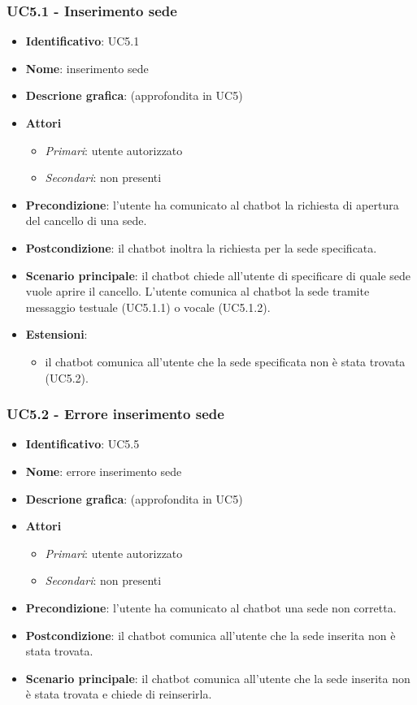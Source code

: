 \subsubsection{UC5.1 - Inserimento sede}
\begin{itemize}
    \item \textbf{Identificativo}: UC5.1
    \item \textbf{Nome}: inserimento sede
    \item \textbf{Descrione grafica}: (approfondita in UC5)
    \item \textbf{Attori}
 \begin{itemize} 
    \item \textit{Primari}: utente autorizzato 
    \item \textit{Secondari}: non presenti
 \end{itemize}
 \item \textbf{Precondizione}: l'utente ha comunicato al chatbot la richiesta di apertura del cancello di una sede.
 \item \textbf{Postcondizione}: il chatbot inoltra la richiesta per la sede specificata.
 \item \textbf{Scenario principale}: il chatbot chiede all'utente di specificare di quale sede vuole aprire il cancello. L'utente comunica al chatbot la sede tramite messaggio testuale (UC5.1.1) o vocale (UC5.1.2).
\item \textbf{Estensioni}: 
 \begin{itemize} 
    \item il chatbot comunica all'utente che la sede specificata non è stata trovata (UC5.2).
 \end{itemize}
\end{itemize}
\subsubsection{UC5.2 - Errore inserimento sede}
\begin{itemize}
    \item \textbf{Identificativo}: UC5.5
    \item \textbf{Nome}: errore inserimento sede
    \item \textbf{Descrione grafica}: (approfondita in UC5)
    \item \textbf{Attori}
 \begin{itemize} 
    \item \textit{Primari}: utente autorizzato 
    \item \textit{Secondari}: non presenti
 \end{itemize}
 \item \textbf{Precondizione}: l'utente ha comunicato al chatbot una sede non corretta.
 \item \textbf{Postcondizione}: il chatbot comunica all'utente che la sede inserita non è stata trovata.
 \item \textbf{Scenario principale}: il chatbot comunica all'utente che la sede inserita non è stata trovata e chiede di reinserirla.
\end{itemize}
